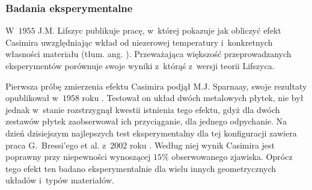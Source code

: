 \documentclass[10pt,t]{beamer}
\begin{document}
\begin{frame}
  \frametitle{Badania eksperymentalne}


  W~$1955$ J.M. Lifszyc publikuje pracę, w~której pokazuje jak obliczyć
  efekt Casimira uwzględniając wkład od niezerowej temperatury
  i~konkretnych własności materiału (tłum. ang.
  \parencite{Lifshitz-The-theory-of-molecular-ETC-Pub-1956}). Przeważająca
  większość przeprowadzanych eksperymentów porównuje swoje wyniki z~którąś
  z~wersji teorii Lifszyca.

  Pierwsza próbę zmierzenia efektu Casimira podjął M.J. Sparnaay, swoje
  rezultaty opublikował w~$1958$ roku
  \parencite{Sparnaay-Measurments-of-attractive-forces-ETC-Pub-1958}.
  Testował on układ dwóch metalowych płytek, nie był jednak w~stanie
  rozstrzygnął kwestii istnienia tego efektu, gdyż dla dwóch zestawów
  płytek zaobserwował ich przyciąganie, dla jednego odpychanie. %
  Na dzień dzisiejszym najlepszych test eksperymentalny dla tej konfiguracji
  zawiera praca G.~Bressi’ego et al. z~$2002$ roku
  \parencite{Bressi-et-al-Measurement-of-the-Casimir-Force-ETC-2002}.
  Według niej wynik Casimira jest poprawny przy niepewności wynoszącej
  $15\%$ obserwowanego zjawiska. Oprócz tego efekt ten badano
  eksperymentalnie dla wielu innych geometrycznych układów i~typów
  materiałów.

\end{frame}








\end{document}
